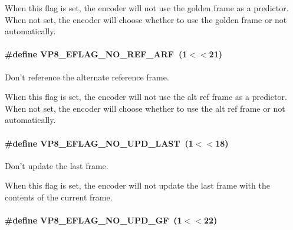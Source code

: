When this flag is set, the encoder will not use the golden frame as a predictor. When not set, the encoder will choose whether to use the golden frame or not automatically. \hypertarget{group__vp8__encoder_ga650ab0baea12be91082226a5cc18776a}{
\paragraph[{V\-P8\-\_\-\-E\-F\-L\-A\-G\-\_\-\-N\-O\-\_\-\-R\-E\-F\-\_\-\-A\-R\-F}]{\setlength{\rightskip}{0pt plus 5cm}\#define V\-P8\-\_\-\-E\-F\-L\-A\-G\-\_\-\-N\-O\-\_\-\-R\-E\-F\-\_\-\-A\-R\-F~(1$<$$<$21)}}\label{group__vp8__encoder_ga650ab0baea12be91082226a5cc18776a}


Don't reference the alternate reference frame. 

When this flag is set, the encoder will not use the alt ref frame as a predictor. When not set, the encoder will choose whether to use the alt ref frame or not automatically. \hypertarget{group__vp8__encoder_ga602edb6b02a89cb2db7a16d6dffba583}{
\paragraph[{V\-P8\-\_\-\-E\-F\-L\-A\-G\-\_\-\-N\-O\-\_\-\-U\-P\-D\-\_\-\-L\-A\-S\-T}]{\setlength{\rightskip}{0pt plus 5cm}\#define V\-P8\-\_\-\-E\-F\-L\-A\-G\-\_\-\-N\-O\-\_\-\-U\-P\-D\-\_\-\-L\-A\-S\-T~(1$<$$<$18)}}\label{group__vp8__encoder_ga602edb6b02a89cb2db7a16d6dffba583}


Don't update the last frame. 

When this flag is set, the encoder will not update the last frame with the contents of the current frame. \hypertarget{group__vp8__encoder_gab01d066c5236457d345ce1cab4c41d6b}{
\paragraph[{V\-P8\-\_\-\-E\-F\-L\-A\-G\-\_\-\-N\-O\-\_\-\-U\-P\-D\-\_\-\-G\-F}]{\setlength{\rightskip}{0pt plus 5cm}\#define V\-P8\-\_\-\-E\-F\-L\-A\-G\-\_\-\-N\-O\-\_\-\-U\-P\-D\-\_\-\-G\-F~(1$<$$<$22)}}\label{group__vp8__encoder_gab01d066c5236457d345ce1cab4c41d6b}


